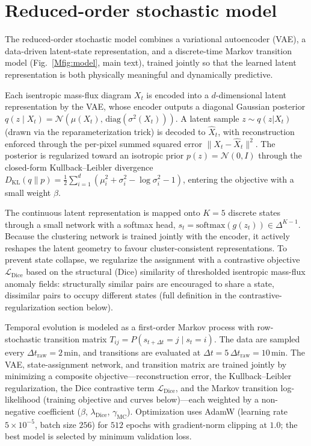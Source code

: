 \documentclass[
    aps,
    prl,
    reprint,
    superscriptaddress,
    amsmath,amssymb,
    nofootinbib,
    floatfix
]{revtex4-2}
\begin{document}
\section{Reduced-order stochastic model}

The reduced-order stochastic model combines a variational autoencoder (VAE), a data-driven latent-state representation, and a discrete-time Markov transition model (Fig.~\ref{Mfig:model}, main text), trained jointly so that the learned latent representation is both physically meaningful and dynamically predictive.

Each isentropic mass-flux diagram $X_t$ is encoded into a $d$-dimensional latent representation by the VAE, whose encoder outputs a diagonal Gaussian posterior $q(z \mid X_t) = \mathcal{N}(\mu(X_t),\,\mathrm{diag}(\sigma^2(X_t)))$. A latent sample $z\sim q(z|X_t)$ (drawn via the reparameterization trick) is decoded to $\hat{X}_t$, with reconstruction enforced through the per-pixel summed squared error $\|X_t-\hat{X}_t\|^2$. The posterior is regularized toward an isotropic prior $p(z)=\mathcal{N}(0,I)$ through the closed-form Kullback--Leibler divergence $D_{\mathrm{KL}}(q\|p) = \tfrac{1}{2}\sum_{i=1}^d(\mu_i^2+\sigma_i^2-\log\sigma_i^2-1)$, entering the objective with a small weight $\beta$.

The continuous latent representation is mapped onto $K=5$ discrete states through a small network with a softmax head, $s_t = \mathrm{softmax}(g(z_t)) \in \Delta^{K-1}$. Because the clustering network is trained jointly with the encoder, it actively reshapes the latent geometry to favour cluster-consistent representations. To prevent state collapse, we regularize the assignment with a contrastive objective $\mathcal{L}_{\mathrm{Dice}}$ based on the structural (Dice) similarity of thresholded isentropic mass-flux anomaly fields: structurally similar pairs are encouraged to share a state, dissimilar pairs to occupy different states (full definition in the contrastive-regularization section below).

Temporal evolution is modeled as a first-order Markov process with row-stochastic transition matrix $T_{ij} = P(s_{t+\Delta t} = j \mid s_t = i)$. The data are sampled every $\Delta t_\text{raw}=2\,\mathrm{min}$, and transitions are evaluated at $\Delta t = 5\,\Delta t_\text{raw} = 10\,\mathrm{min}$. The VAE, state-assignment network, and transition matrix are trained jointly by minimizing a composite objective---reconstruction error, the Kullback--Leibler regularization, the Dice contrastive term $\mathcal{L}_{\mathrm{Dice}}$, and the Markov transition log-likelihood (training objective and curves below)---each weighted by a non-negative coefficient ($\beta$, $\lambda_{\mathrm{Dice}}$, $\gamma_{\mathrm{MC}}$). Optimization uses AdamW (learning rate $5\times10^{-5}$, batch size $256$) for $512$ epochs with gradient-norm clipping at $1.0$; the best model is selected by minimum validation loss.
\end{document}
